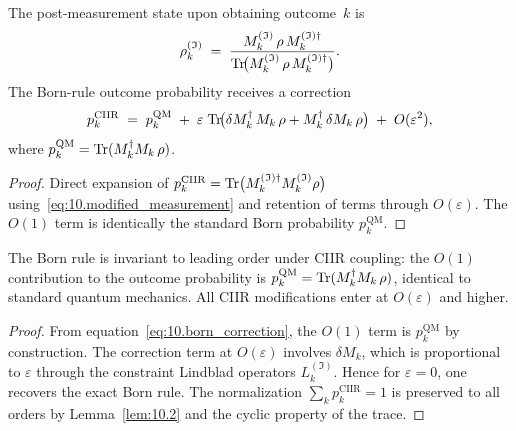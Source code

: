 \begin{theorem}
\label{thm:10.5}
The post-measurement state upon obtaining outcome~$k$ is
\[
  \rho_k^{(\mathfrak{I})}
  \;=\;
  \frac{M_k^{(\mathfrak{I})}\,\rho\,M_k^{(\mathfrak{I})\dagger}}
       {\mathrm{Tr}\!\bigl(M_k^{(\mathfrak{I})}\,\rho\,
                    M_k^{(\mathfrak{I})\dagger}\bigr)}.
\]
The Born-rule outcome probability receives a correction
\begin{equation}
\label{eq:10.born_correction}
  p_k^{\mathrm{CIIR}}
  \;=\;
  p_k^{\mathrm{QM}}
  \;+\;
  \varepsilon\;\mathrm{Tr}\!\bigl(
    \delta M_k^{\dagger}\,M_k\,\rho
    + M_k^{\dagger}\,\delta M_k\,\rho
  \bigr)
  \;+\;
  O(\varepsilon^2),
\end{equation}
where $p_k^{\mathrm{QM}}=\mathrm{Tr}(M_k^{\dagger}M_k\,\rho)$.
\end{theorem}

\begin{proof}
Direct expansion of
$p_k^{\mathrm{CIIR}}
= \mathrm{Tr}\bigl(M_k^{(\mathfrak{I})\dagger}M_k^{(\mathfrak{I})}\rho\bigr)$
using~\eqref{eq:10.modified_measurement} and retention of terms
through $O(\varepsilon)$.  The $O(1)$ term is identically the standard
Born probability $p_k^{\mathrm{QM}}$.
\end{proof}

\begin{theorem}
\label{thm:10.6}
The Born rule is invariant to leading order under CIIR coupling:
the $O(1)$ contribution to the outcome probability is
$p_k^{\mathrm{QM}} = \mathrm{Tr}(M_k^{\dagger}M_k\,\rho)$,
identical to standard quantum mechanics.  All CIIR modifications
enter at $O(\varepsilon)$ and higher.
\end{theorem}

\begin{proof}
From equation~\eqref{eq:10.born_correction}, the $O(1)$ term is
$p_k^{\mathrm{QM}}$ by construction.  The correction term at
$O(\varepsilon)$ involves $\delta M_k$, which is proportional to
$\varepsilon$ through the constraint Lindblad operators
$L_k^{(\mathfrak{I})}$.  Hence for $\varepsilon=0$, one recovers the
exact Born rule.  The normalization $\sum_k p_k^{\mathrm{CIIR}}=1$ is
preserved to all orders by Lemma~\ref{lem:10.2} and the cyclic
property of the trace.
\end{proof}

